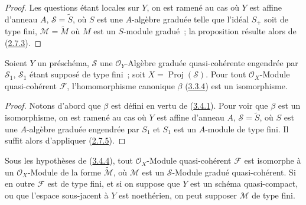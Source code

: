 \begin{proof}
Les questions étant locales sur $Y$, on est ramené au cas où $Y$ est affine
d'anneau $A$, $\mathcal{S}=\widetilde{S}$, où $S$ est une $A$-algèbre graduée
telle que l'idéal $S_+$ soit de type fini,
$\mathcal{M}=\widetilde{M}$ où $M$ est un $S$-module gradué~; la proposition
résulte alors de (\hyperref[II.2.7.3-fr]{2.7.3}).
\end{proof}

\begin{theorem}[3.4.4]
\label{II.3.4.4-fr}
Soient $Y$ un préschéma, $\mathcal{S}$ une $\mathcal{O}_Y$-Algèbre graduée
quasi-cohérente engendrée par $\mathcal{S}_1$, $\mathcal{S}_1$ étant supposé
de type fini~; soit $X=\operatorname{Proj}(\mathcal{S})$. Pour tout
$\mathcal{O}_X$-Module quasi-cohérent $\mathcal{F}$, l'homomorphisme canonique
$\beta$ \textup{(\hyperref[II.3.3.4-fr]{3.3.4})} est un isomorphisme.
\end{theorem}

\begin{proof}
Notons d'abord que $\beta$ est défini en vertu de
(\hyperref[II.3.4.1-fr]{3.4.1}). Pour voir que $\beta$ est un isomorphisme,
on est ramené au cas où $Y$ est affine d'anneau $A$,
$\mathcal{S}=\widetilde{S}$, où $S$ est une $A$-algèbre graduée engendrée par
$S_1$ et $S_1$ est un $A$-module de type fini. Il suffit alors d'appliquer
(\hyperref[II.2.7.5-fr]{2.7.5}).
\end{proof}

\begin{corollary}[3.4.5]
\label{II.3.4.5-fr}
Sous les hypothèses de \textup{(\hyperref[II.3.4.4-fr]{3.4.4})}, tout
$\mathcal{O}_X$-Module quasi-cohérent $\mathcal{F}$ est isomorphe à un
$\mathcal{O}_X$-Module de la forme $\widetilde{\mathcal{M}}$, où
$\mathcal{M}$ est un $\mathcal{S}$-Module gradué quasi-cohérent. Si en outre
$\mathcal{F}$ est de type fini, et si on suppose que $Y$ est un schéma
quasi-compact, ou que l'espace sous-jacent à $Y$ est noethérien, on peut
supposer $\mathcal{M}$ de type fini.
\end{corollary}


